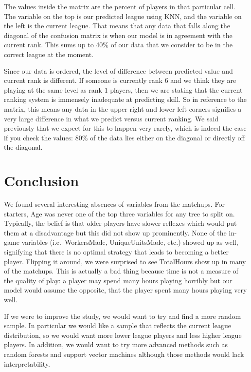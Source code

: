 \documentclass[letterpaper,10pt,english]{/usr/share/sphinx/texinputs/sphinxhowto}
\begin{document}
        
    
The values inside the matrix are the percent of players in that
particular cell. The variable on the top is our predicted league using
KNN, and the variable on the left is the current league. That means that
any data that falls along the diagonal of the confusion matrix is when
our model is in agreement with the current rank. This sums up to 40\% of
our data that we consider to be in the correct league at the moment.

Since our data is ordered, the level of difference between predicted
value and current rank is different. If someone is currently rank 6 and
we think they are playing at the same level as rank 1 players, then we
are stating that the current ranking system is immensely inadequate at
predicting skill. So in reference to the matrix, this means any data in
the upper right and lower left corners signifies a very large difference
in what we predict versus current ranking. We said previously that we
expect for this to happen very rarely, which is indeed the case if you
check the values: 80\% of the data lies either on the diagonal or
directly off the diagonal.\part{Conclusion}We found several interesting absences of variables from the matchups.
For starters, Age was never one of the top three variables for any tree
to split on. Typically, the belief is that older players have slower
reflexes which would put them at a disadvantage but this did not show up
prominently. None of the in-game variables (i.e.~WorkersMade,
UniqueUnitsMade, etc.) showed up as well, signifying that there is no
optimal strategy that leads to becoming a better player. Flipping it
around, we were surprised to see TotalHours show up in many of the
matchups. This is actually a bad thing because time is not a measure of
the quality of play: a player may spend many hours playing horribly but
our model would assume the opposite, that the player spent many hours
playing very well.

If we were to improve the study, we would want to try and find a more
random sample. In particular we would like a sample that reflects the
current league distribution, so we would want more lower league players
and less higher league players. In addition, we would want to try more
advanced methods such as random forests and support vector machines
although those methods would lack interpretability.
\end{document}
